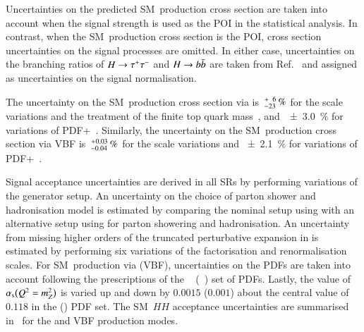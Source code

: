 Uncertainties on the predicted SM~\HH production cross section are taken into
account when the signal strength is used as the POI in the statistical
analysis. In contrast, when the SM~\HH production cross section is the POI,
cross section uncertainties on the signal processes are omitted. In either case,
uncertainties on the branching ratios of $H \to \tau^{+} \tau^{-}$ and $H \to b\bar{b}$ are
taken from Ref.~\cite{deFlorian:2016spz} and assigned as uncertainties on the
signal normalisation.

The uncertainty on the SM~\HH production cross section via \ggF
is~$^{\hspace{0.25pt}+\hspace{0.25pt}\phantom{2}6}_{-23}\,\si{\percent}$
for the scale variations and the treatment of the finite top quark
mass~\cite{Baglio:2020wgt}, and~\SI{\pm 3.0}{\percent} for variations of
PDF+\alphas~\cite{LHCHWGHH}. Similarly, the uncertainty on the SM~\HH production
cross section via VBF
is~$^{\hspace{0.25pt}+\hspace{0.25pt}0.03}_{-0.04}\,\si{\percent}$ for
the scale variations and \SI{\pm 2.1}{\percent} for variations of
PDF+\alphas~\cite{LHCHWGHH}.

Signal acceptance uncertainties are derived in all SRs by performing variations
of the generator setup. An uncertainty on the choice of parton shower and
hadronisation model is estimated by comparing the nominal setup using \PYTHIA[8]
with an alternative setup using \HERWIG[7] for parton showering and
hadronisation. An uncertainty from missing higher orders of the truncated
perturbative expansion in \alphas is estimated by performing six variations of
the factorisation and renormalisation scales. For SM~\HH production via \ggF
(VBF), uncertainties on the PDFs are taken into account following the
prescriptions of the \PDFforLHC[15nlo]~\cite{Butterworth:2015oua}
(\NNPDF[3.0nlo]~\cite{Ball:2014uwa}) set of PDFs. Lastly, the value
of~$\alpha_{\text{s}}\mathopen{}\bigl( Q^2 = m_{Z}^2 \bigr)\mathclose{}$ is varied up and
down by $0.0015$ ($0.001$) about the central value of $0.118$ in the
\PDFforLHC[15nlo] (\NNPDF[3.0nlo]) PDF set. The SM~$HH$ acceptance uncertainties
are summarised in~ for the \ggF and VBF
production modes.


